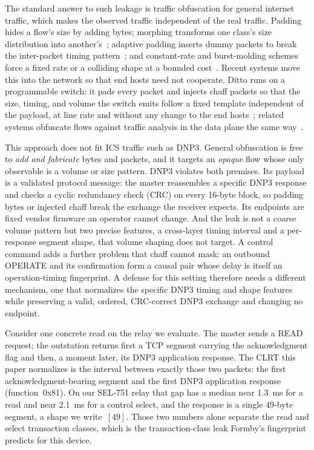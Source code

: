 \documentclass[conference]{IEEEtran}
\begin{document}
The standard answer to such leakage is traffic obfuscation for general internet traffic, which makes
the observed traffic independent of the real traffic. Padding hides a flow's size by adding bytes;
morphing transforms one class's size distribution into another's~\cite{wright2009}; adaptive padding
inserts dummy packets to break the inter-packet timing pattern~\cite{juarez2016}; and constant-rate
and burst-molding schemes force a fixed rate or a colliding shape at a bounded
cost~\cite{tamaraw2014,walkietalkie2017}. Recent systems move this into the network so that end hosts
need not cooperate. Ditto runs on a programmable switch: it pads
every packet and injects chaff packets so that the size, timing, and volume the switch emits follow a
fixed template independent of the payload, at line rate and without any change to the end
hosts~\cite{ditto2022}; related systems obfuscate flows against traffic analysis in the data plane the
same way~\cite{securitas2026,minos2025,nethide2018}.

This approach does not fit ICS traffic such as DNP3. General obfuscation is free to \emph{add and
fabricate} bytes and packets, and it targets an \emph{opaque} flow whose only observable is a volume or
size pattern. DNP3 violates both
premises. Its payload is a validated protocol message: the master reassembles a specific DNP3 response
and checks a cyclic redundancy check (CRC) on every 16-byte block, so padding bytes or injected chaff
break the exchange the receiver expects. Its endpoints are fixed vendor firmware an operator cannot
change. And the leak is not a coarse volume pattern but two precise features, a cross-layer timing
interval and a per-response segment shape, that volume shaping does not target. A control command adds
a further problem that chaff cannot mask: an outbound OPERATE and its confirmation form a causal pair
whose delay is itself an operation-timing fingerprint. A defense for this setting therefore needs a
different mechanism, one that normalizes the specific DNP3 timing and shape features while preserving a
valid, ordered, CRC-correct DNP3 exchange and changing no endpoint.

Consider one concrete read on the relay we evaluate. The master sends a READ request; the outstation
returns first a TCP segment carrying the acknowledgment flag and then, a moment later, its DNP3
application response. The CLRT this paper normalizes is the interval between exactly those two
packets: the first acknowledgment-bearing segment and the first DNP3 application response
(function~0x81). On our SEL-751 relay that gap has a median near 1.3~ms for a read and near 2.1~ms for
a control select, and the response is a single 49-byte segment, a shape we write~$[49]$. Those two
numbers alone separate the read and select transaction classes, which is the transaction-class leak
Formby's fingerprint predicts for this device.
\end{document}
